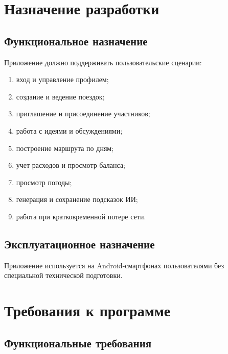 \documentclass[12pt,a4paper]{article}
\begin{document}
\clearpage
\section{Назначение разработки}

\subsection{Функциональное назначение}
Приложение должно поддерживать пользовательские сценарии:
\begin{enumerate}
  \item вход и управление профилем;
  \item создание и ведение поездок;
  \item приглашение и присоединение участников;
  \item работа с идеями и обсуждениями;
  \item построение маршрута по дням;
  \item учет расходов и просмотр баланса;
  \item просмотр погоды;
  \item генерация и сохранение подсказок ИИ;
  \item работа при кратковременной потере сети.
\end{enumerate}

\subsection{Эксплуатационное назначение}
Приложение используется на Android-смартфонах пользователями без специальной технической подготовки.

\clearpage
\section{Требования к программе}

\subsection{Функциональные требования}
\end{document}
